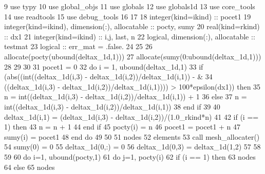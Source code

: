 \begin{DoxyCode}
9       \textcolor{keywordtype}{use }typy
10       \textcolor{keywordtype}{use }global_objs
11       \textcolor{keywordtype}{use }globals
12       \textcolor{keywordtype}{use }globals1d
13       \textcolor{keywordtype}{use }core_tools
14       \textcolor{keywordtype}{use }readtools
15       \textcolor{keywordtype}{use }debug_tools
16 
17 
18       \textcolor{keywordtype}{integer(kind=ikind)} :: pocet1
19       \textcolor{keywordtype}{integer(kind=ikind)}, \textcolor{keywordtype}{dimension(:)}, \textcolor{keywordtype}{allocatable} :: pocty, sumy
20       \textcolor{keywordtype}{real(kind=rkind)} :: dx1
21       \textcolor{keywordtype}{integer(kind=ikind)} :: i,j, last, n
22       \textcolor{keywordtype}{logical}, \textcolor{keywordtype}{dimension(:)}, \textcolor{keywordtype}{allocatable} :: testmat
23       \textcolor{keywordtype}{logical} :: err\_mat = .false.
24 
25 
26       \textcolor{keyword}{allocate}(pocty(ubound(deltax_1d,1)))
27       \textcolor{keyword}{allocate}(sumy(0:ubound(deltax_1d,1)))
28       
29 
30      
31       pocet1 = 0
32       \textcolor{keywordflow}{do} i = 1, ubound(deltax_1d,1)
33         \textcolor{keywordflow}{if} (abs((int((deltax_1d(i,3) - deltax_1d(i,2))/deltax_1d(i,1)) - &
34                   ((deltax_1d(i,3) - deltax_1d(i,2))/deltax_1d(i,1)))) > 100*epsilon(dx1\textcolor{comment}{)) }\textcolor{keywordflow}{then}
35           n = int((deltax_1d(i,3) - deltax_1d(i,2))/deltax_1d(i,1)) + 1
36         \textcolor{keywordflow}{else}
37           n = int((deltax_1d(i,3) - deltax_1d(i,2))/deltax_1d(i,1))
38 \textcolor{keywordflow}{        end if}    
39 
40         deltax_1d(i,1) = (deltax_1d(i,3) - deltax_1d(i,2))/(1.0\_rkind*n)
41 
42         \textcolor{keywordflow}{if} (i == 1) \textcolor{keywordflow}{then}
43           n = n + 1
44 \textcolor{keywordflow}{        end if}
45         pocty(i) = n
46         pocet1 = pocet1 + n
47         sumy(i) = pocet1
48 \textcolor{keywordflow}{      end do}
49       
50 
51       nodes%
52       elements%
53       \textcolor{keyword}{call }mesh_allocater()
54       sumy(0) = 0
55       deltax_1d(0,:) = 0
56       deltax_1d(0,3) = deltax_1d(1,2)
57 
58       
59         
60       \textcolor{keywordflow}{do} i=1, ubound(pocty,1)
61         \textcolor{keywordflow}{do} j=1, pocty(i) 
62           \textcolor{keywordflow}{if} (i == 1) \textcolor{keywordflow}{then}
63             nodes%
64           \textcolor{keywordflow}{else}
65             nodes%

\end{DoxyCode}

